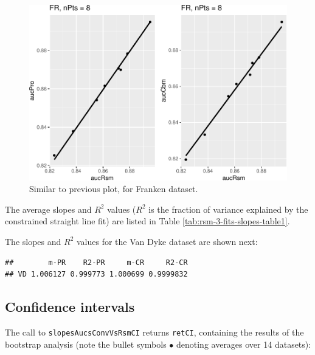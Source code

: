\documentclass[
]{book}
\begin{document}
\begin{figure}
\centering
\includegraphics{19b-rsm-3-fits_files/figure-latex/rsm-3-fits-plots-3-1.pdf}
\caption{\label{fig:rsm-3-fits-plots-3}Similar to previous plot, for Franken dataset.}
\end{figure}

The average slopes and \(R^2\) values (\(R^2\) is the fraction of variance explained by the constrained straight line fit) are listed in Table \ref{tab:rsm-3-fits-slopes-table1}.

The slopes and \(R^2\) values for the Van Dyke dataset are shown next:

\begin{verbatim}
##        m-PR    R2-PR     m-CR     R2-CR
## VD 1.006127 0.999773 1.000699 0.9999832
\end{verbatim}

\hypertarget{rsm-3-fits-confidence-intervals}{%
\subsection{Confidence intervals}\label{rsm-3-fits-confidence-intervals}}

The call to \texttt{slopesAucsConvVsRsmCI} returns \texttt{retCI}, containing the results of the bootstrap analysis (note the bullet symbols \(\bullet\) denoting averages over 14 datasets):
\end{document}
